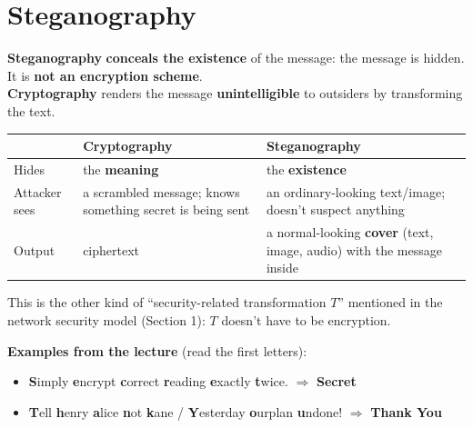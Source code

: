 
\section{Steganography}

\begin{keybox}
\textbf{Steganography} \textbf{conceals the existence} of the message: the message is hidden. It is \textbf{not an encryption scheme}.\\
\textbf{Cryptography} renders the message \textbf{unintelligible} to outsiders by transforming the text.
\end{keybox}
\begin{center}\small
\begin{tabularx}{\textwidth}{@{}l X X@{}}
\toprule
 & \textbf{Cryptography} & \textbf{Steganography}\\
\midrule
Hides & the \textbf{meaning} & the \textbf{existence}\\
Attacker sees & a scrambled message; knows something secret is being sent & an ordinary-looking text/image; doesn't suspect anything\\
Output & ciphertext & a normal-looking \textbf{cover} (text, image, audio) with the message inside\\
\bottomrule
\end{tabularx}
\end{center}
This is the other kind of ``security-related transformation $T$'' mentioned in the network security model (Section 1): $T$ doesn't have to be encryption.

\textbf{Examples from the lecture} (read the first letters):
\begin{itemize}
  \item \textbf{S}imply \textbf{e}ncrypt \textbf{c}orrect \textbf{r}eading \textbf{e}xactly \textbf{t}wice. $\Rightarrow$ \textbf{Secret}
  \item \textbf{T}ell \textbf{h}enry \textbf{a}lice \textbf{n}ot \textbf{k}ane / \textbf{Y}esterday \textbf{o}urplan \textbf{u}ndone! $\Rightarrow$ \textbf{Thank You}
\end{itemize}

